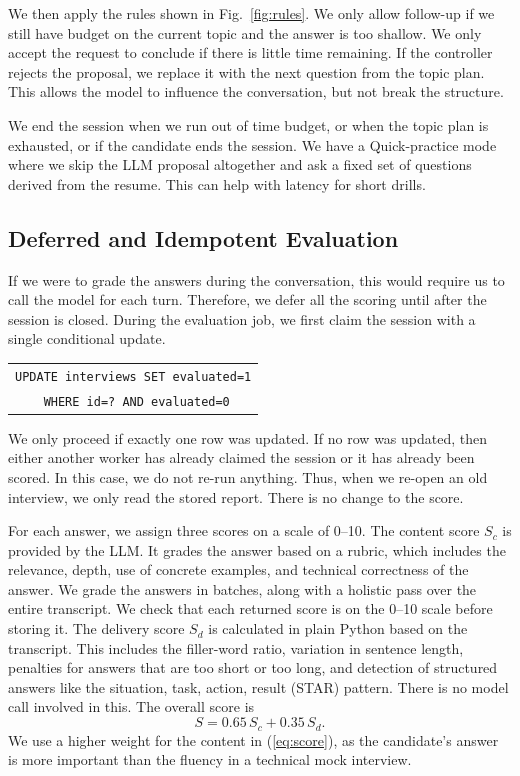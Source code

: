 \documentclass[conference]{IEEEtran}
\begin{document}
We then apply the rules shown in Fig.~\ref{fig:rules}. We only allow follow-up if we still have budget on the current topic and the answer is too shallow. We only accept the request to conclude if there is little time remaining. If the controller rejects the proposal, we replace it with the next question from the topic plan. This allows the model to influence the conversation, but not break the structure.

We end the session when we run out of time budget, or when the topic plan is exhausted, or if the candidate ends the session. We have a Quick-practice mode where we skip the LLM proposal altogether and ask a fixed set of questions derived from the resume. This can help with latency for short drills.

\subsection{Deferred and Idempotent Evaluation}
If we were to grade the answers during the conversation, this would require us to call the model for each turn. Therefore, we defer all the scoring until after the session is closed. During the evaluation job, we first claim the session with a single conditional update.
\begin{center}
\small
\begin{tabular}{l}
\texttt{UPDATE interviews SET evaluated=1}\\
\texttt{\ \ \ \ WHERE id=? AND evaluated=0}
\end{tabular}
\end{center}
We only proceed if exactly one row was updated. If no row was updated, then either another worker has already claimed the session or it has already been scored. In this case, we do not re-run anything. Thus, when we re-open an old interview, we only read the stored report. There is no change to the score.

For each answer, we assign three scores on a scale of 0--10. The content score $S_c$ is provided by the LLM. It grades the answer based on a rubric, which includes the relevance, depth, use of concrete examples, and technical correctness of the answer. We grade the answers in batches, along with a holistic pass over the entire transcript. We check that each returned score is on the 0--10 scale before storing it. The delivery score $S_d$ is calculated in plain Python based on the transcript. This includes the filler-word ratio, variation in sentence length, penalties for answers that are too short or too long, and detection of structured answers like the situation, task, action, result (STAR) pattern. There is no model call involved in this. The overall score is
\begin{equation}
S = 0.65\,S_c + 0.35\,S_d.
\label{eq:score}
\end{equation}
We use a higher weight for the content in (\ref{eq:score}), as the candidate's answer is more important than the fluency in a technical mock interview.
\end{document}
